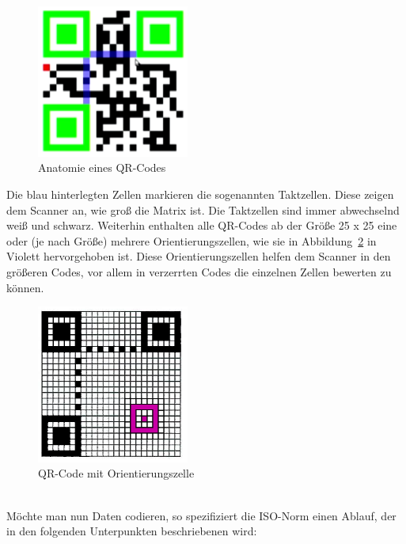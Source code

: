 \begin{figure}[htbp]
	\centering
	\includegraphics[width=5cm]{Bilder/QR_Code_Anatomie.png}
	\caption[Anatomie eines QR-Codes]{Anatomie eines QR-Codes\footnotemark}
	\label{fig:qranatomy}
	\hfill
\end{figure}

Die blau hinterlegten Zellen markieren die sogenannten Taktzellen. Diese zeigen dem Scanner an, wie groß die Matrix ist. Die Taktzellen sind immer abwechselnd weiß und schwarz.
Weiterhin enthalten alle QR-Codes ab der Größe 25 x 25 eine oder (je nach Größe) mehrere Orientierungszellen, wie sie in Abbildung~\ref{fig:qrorientation} in Violett hervorgehoben ist.
Diese Orientierungszellen helfen dem Scanner in den größeren Codes, vor allem in verzerrten Codes die einzelnen Zellen bewerten zu können.
\begin{figure}[htbp]
	\centering
	\includegraphics[width=5cm]{Bilder/Orientierungszelle.png}
	\caption[QR-Code mit Orientierungszelle]{QR-Code mit Orientierungszelle\footnotemark}
	\label{fig:qrorientation}
\end{figure}
~\\
Möchte man nun Daten codieren, so spezifiziert die ISO-Norm einen Ablauf, der in den folgenden Unterpunkten beschriebenen wird:\\
\vspace*{-0.8cm}
